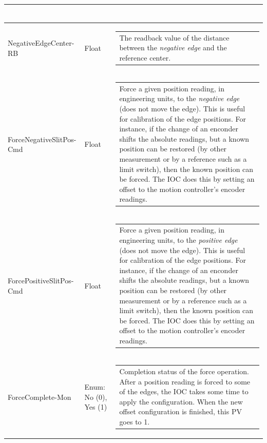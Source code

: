 \documentclass[openany]{article}
\begin{document}
\begin{longtable}{| m{4.5cm} m{2.5cm}  m{7.0cm} |}
\begin{tabular}{@{}m{6cm}@{}}
            \end{tabular} \hypertarget{}{}\\ \hline
        NegativeEdgeCenter-RB & Float & \begin{tabular}{@{}m{6cm}@{}}
                The readback value of the distance between the \emph{negative edge} and the reference center.
            \end{tabular} \hypertarget{pv:force-negative-edge-pos-cmd}{}\\ \hline
        ForceNegativeSlitPos-Cmd & Float & \begin{tabular}{@{}m{6cm}@{}}
                Force a given position reading, in engineering units, to the \emph{negative edge} (does not move the edge). This is useful for calibration of the edge positions. For instance, if the change of an enconder shifts the absolute readings, but a known position can be restored (by other measurement or by a reference such as a limit switch), then the known position can be forced. The IOC does this by setting an offset to the motion controller's encoder readings.
            \end{tabular} \hypertarget{pv:force-positive-edge-pos-cmd}{}\\ \hline
        ForcePositiveSlitPos-Cmd & Float & \begin{tabular}{@{}m{6cm}@{}}
                Force a given position reading, in engineering units, to the \emph{positive edge} (does not move the edge). This is useful for calibration of the edge positions. For instance, if the change of an enconder shifts the absolute readings, but a known position can be restored (by other measurement or by a reference such as a limit switch), then the known position can be forced. The IOC does this by setting an offset to the motion controller's encoder readings.
            \end{tabular} \hypertarget{pv:force-complete-mon}{}\\ \hline
        ForceComplete-Mon & Enum: No (0), Yes (1) & \begin{tabular}{@{}m{6cm}@{}}
                Completion status of the force operation. After a position reading is forced to some of the edges, the IOC takes some time to apply the configuration. When the new offset configuration is finished, this PV goes to 1.
            \end{tabular} \hypertarget{pv:home-cmd}{}\\ \hline

\end{longtable}
\end{document}
